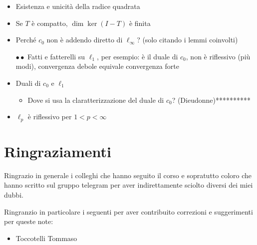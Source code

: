 \documentclass[a4paper]{report}
\begin{document}
\begin{itemize}
\item Esistenza e unicit\`a della radice quadrata
\item Se $T$ \`e compatto, $\dim\ker(I-T)$ \`e finita
\item Perch\'e $c_0$ non \`e addendo diretto di $\ell_\infty$? (solo citando i lemmi coinvolti)
\item[$\bullet\bullet$] Fatti e fatterelli su $\ell_1$, per esempio: \`e il duale di $c_0$, non \`e riflessivo (pi\`u modi), convergenza debole equivale convergenza forte
\item Duali di $c_0$ e $\ell_1$
\begin{itemize}
    \item Dove si usa la claratterizzazione del duale di $c_0$? (Dieudonne)**********
\end{itemize}
\item $\ell_p$ \`e riflessivo per $1<p<\infty$
\end{itemize}





\chapter{Ringraziamenti}
Ringrazio in generale i colleghi che hanno seguito il corso e sopratutto coloro che hanno scritto sul gruppo telegram per aver indirettamente sciolto diversi dei miei dubbi.


Ringranzio in particolare i seguenti per aver contribuito correzioni e suggerimenti per queste note:
\begin{itemize}
\item Toccotelli Tommaso
\end{itemize}
\end{document}
